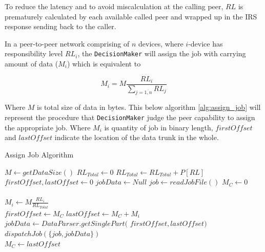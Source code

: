\documentclass[conference]{IEEEtran}
\begin{document}
To reduce the latency and to avoid miscalculation at the calling peer, $RL$ is prematurely calculated by each available called peer and wrapped up in the IRS response sending back to the caller. 

In a peer-to-peer network comprising of $n$ devices, where $i$-device has responsibility level $RL_{i}$, the \texttt{DecisionMaker} will assign the job with carrying amount of data ($M_{i}$) which is equivalent to

$$M_{i} = M\frac{RL_{i}}{\sum_{j = \overline{1,n}}{RL_{j}}}$$

Where $M$ is total size of data in bytes. This below algorithm \ref{alg:assign_job} will represent the procedure that \texttt{DecisionMaker} judge the peer capability to assign the appropriate job. Where $M_{i}$ is quantity of job in binary length, $firstOffset$ and $lastOffset$ indicate the location of the data trunk in the whole.

\begin{algorithm}
\caption{Assign Job Algorithm}
\label{alg:assign_job}
\begin{algorithmic}[1]
\begin{footnotesize}
\State $M \leftarrow {getDataSize()}$
\State $RL_{Total} \leftarrow 0$ 
  \State $RL_{Total} \leftarrow RL_{Total} + P[RL]$
\EndFor
\\
\State $firstOffset, lastOffset \leftarrow 0$
\State $jobData \leftarrow Null$
\State $job \leftarrow {readJobFile()}$
\State $M_{C} \leftarrow 0$
\\
\\
  \State $M_{i} \leftarrow M\frac{RL_{i}}{RL_{Total}}$\\
  \State $firstOffset \leftarrow M_{C} $
  \State $lastOffset \leftarrow M_{C} + M_{i}$
  \State $jobData \leftarrow DataParser.getSinglePart($
  \State 
		\hspace{\algorithmicindent}
		\hspace{\algorithmicindent}
		\hspace{\algorithmicindent}
		\hspace{\algorithmicindent}
		\hspace{\algorithmicindent}
						$firstOffset, lastOffset)$
  \State $dispatchJob(\{job, jobData\})$\\
  \State $M_{C} \leftarrow lastOffset$
  
\EndFor

\EndFunction
\end{footnotesize}
\end{algorithmic}
\end{algorithm}
\end{document}
